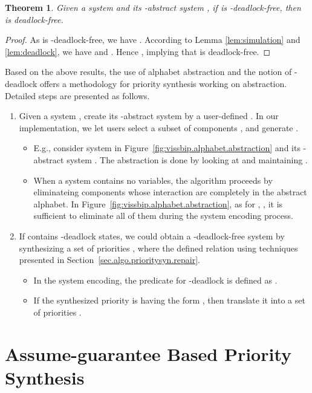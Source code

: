 \documentclass[10pt, a4paper, onecolumn, conference, compsocconf]{IEEEtran}
\newtheorem{theo}{Theorem}
\begin{document}
\begin{theo}\label{the:free}
Given a system  and its -abstract system , if  is -deadlock-free, then  is deadlock-free.
\end{theo}

\begin{proof}
As  is -deadlock-free, we have . According to Lemma \ref{lem:simulation} and \ref{lem:deadlock}, we have  and . Hence , implying that  is deadlock-free.
\end{proof}

 Based on the above results, the use of alphabet abstraction and the notion of -deadlock offers a methodology for priority synthesis working on abstraction. Detailed steps are presented as follows.
\begin{enumerate}
 \item Given a system , create its -abstract system  by a user-defined . In our implementation, we let users select a subset of components , and generate .
     \begin{itemize}
        \item E.g., consider system  in Figure~\ref{fig:vissbip.alphabet.abstraction} and its -abstract system . The abstraction is done by looking at  and maintaining .
        \item When a system contains no variables, the algorithm proceeds by eliminateing components whose interaction are completely in the abstract alphabet. In Figure~\ref{fig:vissbip.alphabet.abstraction}, as for , , it is sufficient to eliminate all of them during the system encoding process.
    \end{itemize}
\item  If  contains -deadlock states, we could obtain a -deadlock-free system by synthesizing a set of priorities , where the defined relation  using techniques presented in Section~\ref{sec.algo.prioritysyn.repair}.
    \begin{itemize}
        \item In the system encoding, the predicate  for -deadlock is defined as .
        \item If the synthesized priority is having the form , then translate it into a set of priorities .
    \end{itemize}

\end{enumerate}

\section{Assume-guarantee Based Priority Synthesis\label{sec.algo.prioritysyn.assume.guarantee}}
\end{document}
